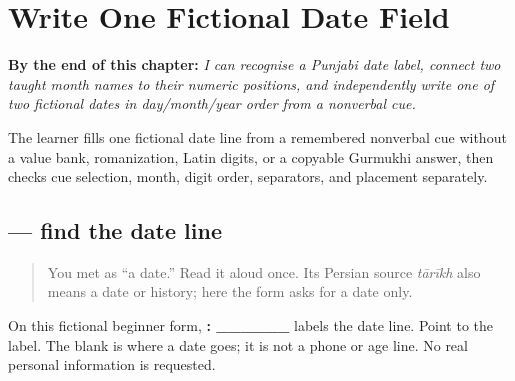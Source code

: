
\chapter{Write One Fictional Date Field}
\label{ch:pa-form-date-runway}

\begin{chapteropening}
\textbf{By the end of this chapter:} \emph{I can recognise a Punjabi date label, connect two taught month names to their numeric positions, and independently write one of two fictional dates in day/month/year order from a nonverbal cue.}

The learner fills one fictional date line from a remembered nonverbal cue without a value bank, romanization, Latin digits, or a copyable Gurmukhi answer, then checks cue selection, month, digit order, separators, and placement separately.
\end{chapteropening}

\section[\texorpdfstring{\pa{ਤਾਰੀਖ਼} (tārīkh)}{ਤਾਰੀਖ਼ (tārīkh)}]{ — find the date line}

\label{lesson:PA-W09-date-label}



\begin{quote}
You met \textbf{} as “a date.” Read it aloud once. Its Persian source \emph{tārīkh} also means a date or history; here the form asks for a date only.
\end{quote}

\begin{tcolorbox}[breakable,skin=enhanced,colback=orange!6,colframe=orange!45!black,boxrule=0.5pt,arc=1mm,left=6pt,right=6pt,top=4pt,bottom=4pt,fonttitle=\bfseries,title={Read this}]
On this fictional beginner form, \textbf{: \_\_\_\_\_\_} labels the date line. Point to the label. The blank is where a date goes; it is not a phone or age line. No real personal information is requested.
\end{tcolorbox}

